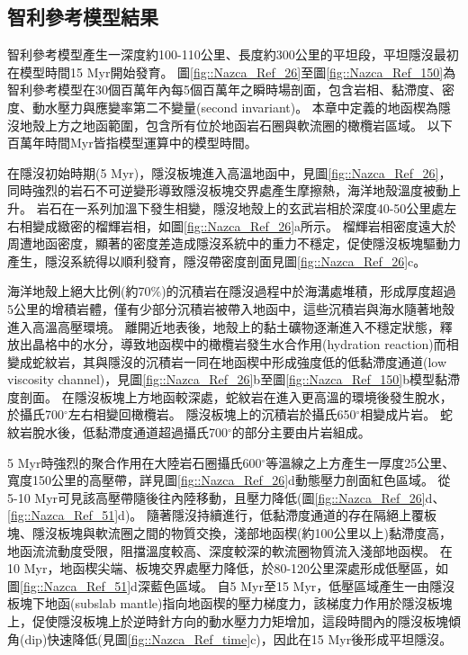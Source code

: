 \subsection{智利參考模型結果}\label{智利參考模型結果}
智利參考模型產生一深度約100-110公里、長度約300公里的平坦段，平坦隱沒最初在模型時間15 Myr開始發育。
圖\ref{fig::Nazca_Ref_26}至圖\ref{fig::Nazca_Ref_150}為智利參考模型在30個百萬年內每5個百萬年之瞬時場剖面，包含岩相、黏滯度、密度、動水壓力與應變率第二不變量(second invariant)。
本章中定義的地函楔為隱沒地殼上方之地函範圍，包含所有位於地函岩石圈與軟流圈的橄欖岩區域。
以下百萬年時間Myr皆指模型運算中的模型時間。

在隱沒初始時期(5 Myr)，隱沒板塊進入高溫地函中，見圖\ref{fig::Nazca_Ref_26}，同時強烈的岩石不可逆變形導致隱沒板塊交界處產生摩擦熱，海洋地殼溫度被動上升。
岩石在一系列加溫下發生相變，隱沒地殼上的玄武岩相於深度40-50公里處左右相變成緻密的榴輝岩相，如圖\ref{fig::Nazca_Ref_26}a所示。
榴輝岩相密度遠大於周遭地函密度，顯著的密度差造成隱沒系統中的重力不穩定，促使隱沒板塊驅動力產生，隱沒系統得以順利發育，隱沒帶密度剖面見圖\ref{fig::Nazca_Ref_26}c。

海洋地殼上絕大比例(約70$\%$)的沉積岩在隱沒過程中於海溝處堆積，形成厚度超過5公里的增積岩體，僅有少部分沉積岩被帶入地函中，這些沉積岩與海水隨著地殼進入高溫高壓環境。
離開近地表後，地殼上的黏土礦物逐漸進入不穩定狀態，釋放出晶格中的水分，導致地函楔中的橄欖岩發生水合作用(hydration reaction)而相變成蛇紋岩，其與隱沒的沉積岩一同在地函楔中形成強度低的低黏滯度通道(low viscosity channel)，見圖\ref{fig::Nazca_Ref_26}b至圖\ref{fig::Nazca_Ref_150}b模型黏滯度剖面。
在隱沒板塊上方地函較深處，蛇紋岩在進入更高溫的環境後發生脫水，於攝氏700$^{\circ}$左右相變回橄欖岩。
隱沒板塊上的沉積岩於攝氏650$^{\circ}$相變成片岩。
蛇紋岩脫水後，低黏滯度通道超過攝氏700$^{\circ}$的部分主要由片岩組成。

5 Myr時強烈的聚合作用在大陸岩石圈攝氏600$^{\circ}$等溫線之上方產生一厚度25公里、寬度150公里的高壓帶，詳見圖\ref{fig::Nazca_Ref_26}d動態壓力剖面紅色區域。
從5-10 Myr可見該高壓帶隨後往內陸移動，且壓力降低(圖\ref{fig::Nazca_Ref_26}d、\ref{fig::Nazca_Ref_51}d)。
隨著隱沒持續進行，低黏滯度通道的存在隔絕上覆板塊、隱沒板塊與軟流圈之間的物質交換，淺部地函楔(約100公里以上)黏滯度高，地函流流動度受限，阻擋溫度較高、深度較深的軟流圈物質流入淺部地函楔。
在10 Myr，地函楔尖端、板塊交界處壓力降低，於80-120公里深處形成低壓區，如圖\ref{fig::Nazca_Ref_51}d深藍色區域。 
自5 Myr至15 Myr，低壓區域產生一由隱沒板塊下地函(subslab mantle)指向地函楔的壓力梯度力，該梯度力作用於隱沒板塊上，促使隱沒板塊上於逆時針方向的動水壓力力矩增加，這段時間內的隱沒板塊傾角(dip)快速降低(見圖\ref{fig::Nazca_Ref_time}c)，因此在15 Myr後形成平坦隱沒。

